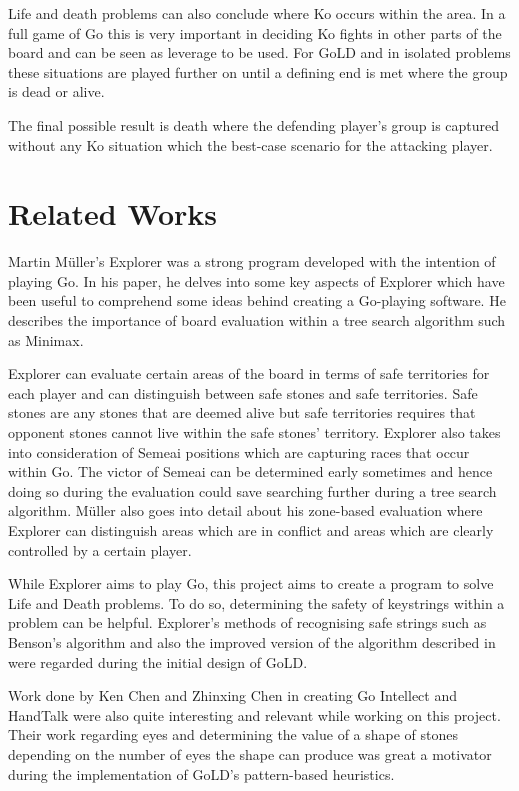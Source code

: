 \documentclass{l4proj}
\begin{document}
Life and death problems can also conclude where Ko occurs within the area. In a full game of Go this is very important in deciding Ko fights in other parts of the board and can be seen as leverage to be used.  For GoLD and in isolated problems these situations are played further on until a defining end is met where the group is dead or alive.

The final possible result is death where the defending player’s group is captured without any Ko situation which the best-case scenario for the attacking player.

\section{Related Works}

Martin Müller's Explorer \cite{Muller2002} was a strong program developed with the intention of playing Go. In his paper, he delves into some key aspects of Explorer which have been useful to comprehend some ideas behind creating a Go-playing software. He describes the importance of board evaluation within a tree search algorithm such as Minimax.

Explorer can evaluate certain areas of the board in terms of safe territories for each player and can distinguish between safe stones and safe territories. Safe stones are any stones that are deemed alive but safe territories requires that opponent stones cannot live within the safe stones' territory. Explorer also takes into consideration of Semeai positions which are capturing races that occur within Go. The victor of Semeai can be determined early sometimes and hence doing so during the evaluation could save searching further during a tree search algorithm. Müller also goes into detail about his zone-based evaluation where Explorer can distinguish areas which are in conflict and areas which are clearly controlled by a certain player.

While Explorer aims to play Go, this project aims to create a program to solve Life and Death problems. To do so, determining the safety of keystrings within a problem can be helpful. Explorer's methods of recognising safe strings such as Benson's algorithm \cite{Benson1976} and also the improved version of the algorithm described in \cite{Muller1998} were regarded during the initial design of GoLD.

Work done by Ken Chen and Zhinxing Chen \cite{Chen1999} in creating Go Intellect and HandTalk were also quite interesting and relevant while working on this project. Their work regarding eyes and determining the value of a shape of stones depending on the number of eyes the shape can produce was great a motivator during the implementation of GoLD's pattern-based heuristics.
\end{document}
